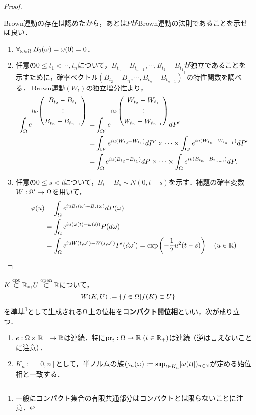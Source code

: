 \documentclass[uplatex,dvipdfmx]{jsreport}
\begin{document}
\begin{proof}
\begin{enumerate}
        Brown運動の存在は認めたから，あとは$P$がBrown運動の法則であることを示せば良い．
        \begin{enumerate}[({B}1)]
            \item $\forall_{\omega\in\Omega}\;B_0(\omega)=\omega(0)=0$．
            \item 任意の$0\le t_1<\cdots,t_n$について，$B_{t_n}-B_{t_{n-1}},\cdots,B_{t_2}-B_{t_1}$が独立であることを示すために，確率ベクトル$(B_{t_2}-B_{t_1},\cdots,B_{t_n}-B_{t_{n-1}})^\top$の特性関数を調べる．
            Brown運動$(W_t)$の独立増分性より，
            \begin{align*}
                \int_\Omega e^{iu\cdot \begin{pmatrix}B_{t_2}-B_{t_1}\\\vdots\\B_{t_n}-B_{t_{n-1}}\end{pmatrix}}&=\int_{\Omega'}e^{iu\cdot \begin{pmatrix}W_{t_2}-W_{t_1}\\\vdots\\W_{t_n}-W_{t_{n-1}}\end{pmatrix}}dP'\\
                &=\int_{\Omega'}e^{iu(W_{t_2}-W_{t_1})}dP'\times\cdots\times\int_{\Omega'}e^{iu(W_{t_n}-W_{t_{n-1}})}dP'\\
                &=\int_\Omega e^{iu(B_{t_2}-B_{t_1})}dP\times\cdots\times\int_\Omega e^{iu(B_{t_n}-B_{t_{n-1}})}dP.
            \end{align*}
            \item 任意の$0\le s<t$について，$B_t-B_s\sim N(0,t-s)$を示す．補題の確率変数$W:\Omega'\to\Omega$を用いて，
            \begin{align*}
                \varphi(u)&=\int_\Omega e^{iuB_t(\omega)-B_s(\omega)}dP(\omega)\\
                &=\int_\Omega e^{iu(\omega(t)-\omega(s))}P(d\omega)\\
                &=\int_\Omega e^{iu W(t,\omega')-W(s,\omega')}P'(d\omega')=\exp\left(-\frac{1}{2}u^2(t-s)\right)\quad(u\in\mathbb{R})
            \end{align*}
        \end{enumerate}
    \end{enumerate}
\end{proof}

\begin{lemma}[コンパクト開位相の性質]
    $K\overset{\textrm{cpt}}{\subset}\mathbb{R}_*,U\overset{\mathrm{open}}{\subset}\mathbb{R}$について，
    \[W(K,U):=\left\{f\in\Omega| f(K)\subset U\right\}\]
    を準基\footnote{一般にコンパクト集合の有限共通部分はコンパクトとは限らないことに注意．}として生成される$\Omega$上の位相を\textbf{コンパクト開位相}といい，次が成り立つ．
    \begin{enumerate}
        \item $e:\Omega\times\mathbb{R}_+\to\mathbb{R}$は連続．特に$\mathrm{pr}_t:\Omega\to\mathbb{R}\;(t\in\mathbb{R}_+)$は連続（逆は言えないことに注意）．
        \item $K_n:=[0,n]$として，半ノルムの族$(\rho_n(\omega):=\sup_{t\in K_n}\lvert\omega(t)\rvert)_{n\in\mathbb{N}}$が定める始位相と一致する．
    \end{enumerate}
\end{lemma}
\end{document}
